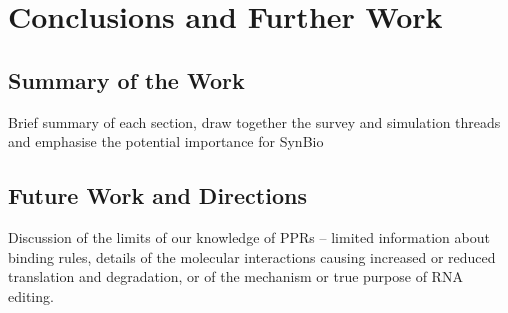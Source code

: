 
\chapter{Conclusions and Further Work}
\label{chap:Conclusions} 

\section{Summary of the Work}

Brief summary of each section, draw together the survey and simulation threads
and emphasise the potential importance for SynBio

\section{Future Work and Directions}

Discussion of the limits of our knowledge of PPRs -- limited information about
binding rules, details of the molecular interactions causing increased or
reduced translation and degradation, or of the mechanism or true purpose of RNA
editing.

